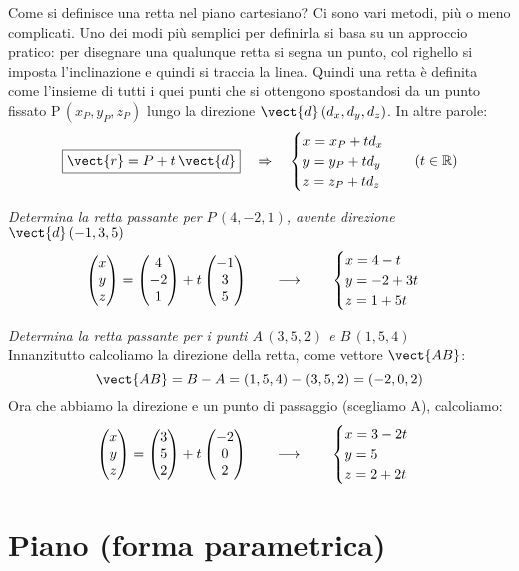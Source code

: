 Come si definisce una retta nel piano cartesiano? Ci sono vari metodi, più o meno complicati. Uno dei modi più semplici per definirla si basa su un approccio pratico: per disegnare una qualunque retta si segna un punto, col righello si imposta l'inclinazione e quindi si traccia la linea. Quindi una retta è definita come l'insieme di tutti i quei punti che si ottengono spostandosi da un punto fissato P\,\((x_P,y_P,z_P)\) lungo la direzione \(\vect{d}\,(d_x,d_y,d_z)\). In altre parole:
\[\boxed{\vect{r} = P+t \, \vect{d}} \quad \Rightarrow \quad \begin{cases}
x = x_P+t d_x \\
y = y_P+t d_y \\
z = z_P+t d_z
\end{cases}  \quad (t \in \mathbb{R})\]
\begin{esempio}
\label{rettaPuntoDirez}
\emph{Determina la retta passante per \(P\,(4,-2,1)\), avente direzione \(\vect{d} \,(-1,3,5)\)}
\[\begin{pmatrix} x\\ y\\ z \end{pmatrix} = \begin{pmatrix} 4\\ -2\\ 1 \end{pmatrix}+t \begin{pmatrix} -1\\ 3\\ 5 \end{pmatrix} \qquad \longrightarrow \qquad\begin{cases}
x = 4-t \\
y = -2+3t \\
z = 1+5t
\end{cases}\]
\end{esempio}
\begin{esempio}
 \emph{Determina la retta passante per i punti \(A\,(3,5,2)\) e \(B\,(1,5,4)\)}\\[5pt]
 Innanzitutto calcoliamo la direzione della retta, come vettore \(\vect{AB}\):
\[\vect{AB} = B-A = (1,5,4)-(3,5,2) = (-2,0,2)\]
Ora che abbiamo la direzione e un punto di passaggio (scegliamo A), calcoliamo:
\[\begin{pmatrix} x\\ y\\ z \end{pmatrix} = \begin{pmatrix} 3\\ 5\\ 2 \end{pmatrix}+t \begin{pmatrix} -2\\ 0\\ 2 \end{pmatrix} \qquad \longrightarrow \qquad\begin{cases}
x = 3-2t \\
y = 5 \\
z = 2+2t
\end{cases}\]
\end{esempio}

\section{Piano (forma parametrica)}

